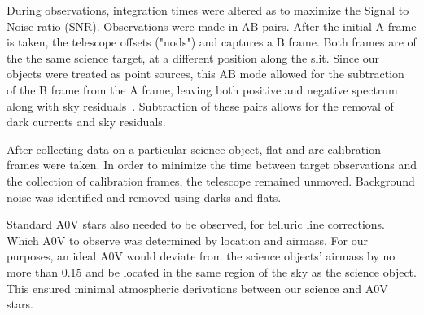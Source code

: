 During observations, integration times were altered as to maximize the Signal to Noise ratio (SNR).  
Observations were made in AB pairs.  After the initial A frame is taken, the telescope offsets ("nods") and captures a B frame.  Both frames are of the the same science target, at a different position along the slit.  Since our objects were treated as point sources, this AB mode allowed for the subtraction of the B frame from the A frame, leaving both positive and negative spectrum along with sky residuals~\cite{Cushing_2004}. Subtraction of these pairs allows for the removal of dark currents and sky residuals.



After collecting data on a particular science object, 
flat and arc calibration frames were taken.  
In order to minimize the time between target observations and 
the collection of calibration frames, the telescope remained unmoved.  
Background noise was identified and removed using darks and flats.



Standard A0V stars also needed to be observed, for telluric line corrections.  Which A0V 
to observe was determined by location and airmass.  For our purposes, an ideal A0V would 
deviate from the science objects' airmass by no more than 0.15 and be located 
in the same region of the sky as the science object.  This ensured minimal 
atmospheric derivations between our science and A0V stars.

